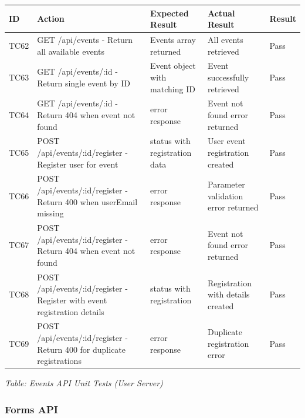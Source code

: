 \documentclass[12pt, titlepage]{article}
\begin{document}
\noindent
\begin{longtable}{|>{\raggedright\arraybackslash}p{1cm}|>{\raggedright\arraybackslash}p{4.5cm}|>{\raggedright\arraybackslash}p{3.5cm}|>{\raggedright\arraybackslash}p{3.5cm}|>{\raggedright\arraybackslash}p{1.5cm}|}
\hline
\textbf{ID} & \textbf{Action} & \textbf{Expected Result} & \textbf{Actual Result} & \textbf{Result} \\\hline
\endhead
\hline
TC62 & GET /api/events - Return all available events & Events array returned & All events retrieved & \cellcolor{green!30}Pass \\
\hline
TC63 & GET /api/events/:id - Return single event by ID & Event object with matching ID & Event successfully retrieved & \cellcolor{green!30}Pass \\
\hline
TC64 & GET /api/events/:id - Return 404 when event not found & 404 error response & Event not found error returned & \cellcolor{green!30}Pass \\
\hline
TC65 & POST /api/events/:id/register - Register user for event & 201 status with registration data & User event registration created & \cellcolor{green!30}Pass \\
\hline
TC66 & POST /api/events/:id/register - Return 400 when userEmail missing & 400 error response & Parameter validation error returned & \cellcolor{green!30}Pass \\
\hline
TC67 & POST /api/events/:id/register - Return 404 when event not found & 404 error response & Event not found error returned & \cellcolor{green!30}Pass \\
\hline
TC68 & POST /api/events/:id/register - Register with event registration details & 201 status with registration & Registration with details created & \cellcolor{green!30}Pass \\
\hline
TC69 & POST /api/events/:id/register - Return 400 for duplicate registrations & 400 error response & Duplicate registration error & \cellcolor{green!30}Pass \\
\hline
\end{longtable}

\vspace{0.5cm}

{\small \textit{Table: Events API Unit Tests (User Server)}}

\subsubsection{Forms API}
\end{document}
